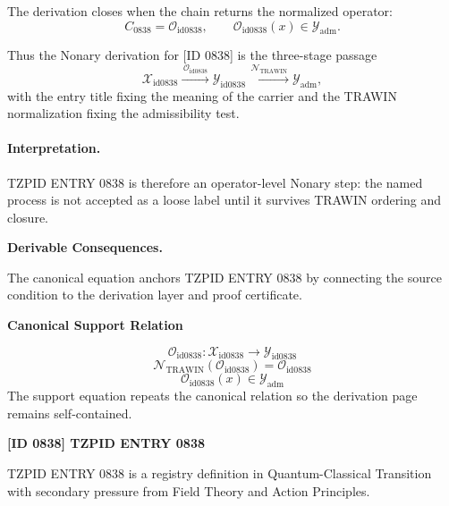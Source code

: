 The derivation closes when the chain returns the normalized operator:\[
C_{0838}=\mathcal{O}_{\mathrm{id0838}},\qquad \mathcal{O}_{\mathrm{id0838}}(x)\in\mathcal{Y}_{\mathrm{adm}}.
\]

Thus the Nonary derivation for [ID 0838] is the three-stage passage
\[
\mathcal{X}_{\mathrm{id0838}}\xrightarrow{\,\mathcal{O}_{\mathrm{id0838}}\,} \mathcal{Y}_{\mathrm{id0838}}\xrightarrow{\,\mathcal{N}_{\mathrm{TRAWIN}}\,} \mathcal{Y}_{\mathrm{adm}},
\]
with the entry title fixing the meaning of the carrier and the TRAWIN normalization fixing the admissibility test.

\paragraph{Interpretation.} TZPID ENTRY 0838 is therefore an operator-level Nonary step: the named process is not accepted as a loose label until it survives TRAWIN ordering and closure.

\par\vspace{0.35em}
\noindent\textbf{Derivable Consequences.}\quad
\begingroup
\footnotesize
\raggedright
The canonical equation anchors TZPID ENTRY 0838 by connecting the source condition to the derivation layer and proof certificate.
\par\endgroup

\noindent\textbf{Canonical Support Relation}\par
\[
\mathcal{O}_{\mathrm{id0838}}:\mathcal{X}_{\mathrm{id0838}}\longrightarrow\mathcal{Y}_{\mathrm{id0838}}
\]
\[
\mathcal{N}_{\mathrm{TRAWIN}}(\mathcal{O}_{\mathrm{id0838}})=\mathcal{O}_{\mathrm{id0838}}
\]
\[
\mathcal{O}_{\mathrm{id0838}}(x)\in\mathcal{Y}_{\mathrm{adm}}
\]
\noindent The support equation repeats the canonical relation so the derivation page remains self-contained.\par

\clearpage
\noindent\textbf{[ID 0838] TZPID ENTRY 0838}\par
\vspace{0.35em}
\begingroup\small
{}
TZPID ENTRY 0838 is a registry definition in Quantum-Classical Transition with secondary pressure from Field Theory and Action Principles.

